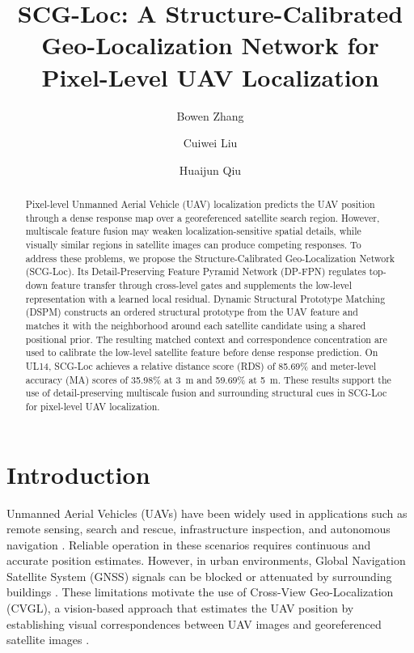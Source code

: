 \documentclass[runningheads]{llncs}
\title{SCG-Loc: A Structure-Calibrated Geo-Localization Network for Pixel-Level UAV Localization}
\author{Bowen Zhang \and Cuiwei Liu \and Huaijun Qiu}
\institute{}
\begin{document}
\maketitle

\begin{abstract}
Pixel-level Unmanned Aerial Vehicle (UAV) localization predicts the UAV position through a dense response map over a georeferenced satellite search region. However, multiscale feature fusion may weaken localization-sensitive spatial details, while visually similar regions in satellite images can produce competing responses. To address these problems, we propose the Structure-Calibrated Geo-Localization Network (SCG-Loc). Its Detail-Preserving Feature Pyramid Network (DP-FPN) regulates top-down feature transfer through cross-level gates and supplements the low-level representation with a learned local residual. Dynamic Structural Prototype Matching (DSPM) constructs an ordered structural prototype from the UAV feature and matches it with the neighborhood around each satellite candidate using a shared positional prior. The resulting matched context and correspondence concentration are used to calibrate the low-level satellite feature before dense response prediction. On UL14, SCG-Loc achieves a relative distance score (RDS) of 85.69\% and meter-level accuracy (MA) scores of 35.98\% at 3~m and 59.69\% at 5~m. These results support the use of detail-preserving multiscale fusion and surrounding structural cues in SCG-Loc for pixel-level UAV localization.

\end{abstract}

\section{Introduction}
Unmanned Aerial Vehicles (UAVs) have been widely used in applications such as remote sensing, search and rescue, infrastructure inspection, and autonomous navigation \cite{shakhatreh2019uavsurvey,jarraya2025gnss}. Reliable operation in these scenarios requires continuous and accurate position estimates. However, in urban environments, Global Navigation Satellite System (GNSS) signals can be blocked or attenuated by surrounding buildings \cite{jarraya2025gnss}. These limitations motivate the use of Cross-View Geo-Localization (CVGL), a vision-based approach that estimates the UAV position by establishing visual correspondences between UAV images and georeferenced satellite images \cite{dai2022denseuav,dai2026drl}.
\end{document}
